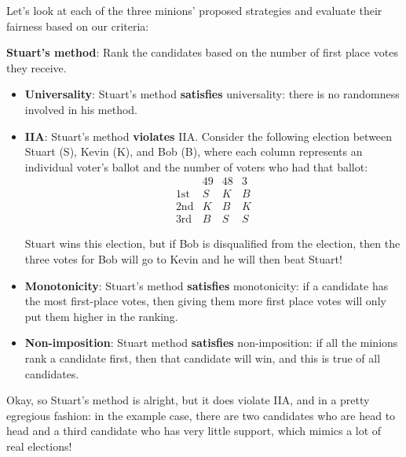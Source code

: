 \documentclass{article}
\begin{document}
Let’s look at each of the three minions’ proposed strategies and evaluate their fairness based on our criteria:

\textbf{Stuart’s method}: Rank the candidates based on the number of first place votes they receive.
\begin{itemize}
	\item \textbf{Universality}: Stuart’s method {\textbf{satisfies}} universality: there is no randomness involved in his method.
	\item \textbf{IIA}: Stuart’s method {\textbf{violates}} IIA. Consider the following election between Stuart (S), Kevin (K), and Bob (B), where each column represents an individual voter’s ballot and the number of voters who had that ballot:
	\[
		\begin{array}{c|ccc}
				& 49 & 48 & 3 \\
			\text{1st} & S & K & B \\
			\text{2nd} & K & B & K \\
			\text{3rd} & B & S & S
		\end{array}
	\]

	Stuart wins this election, but if Bob is disqualified from the election, then the three votes for Bob will go to Kevin and he will then beat Stuart! 
	\item \textbf{Monotonicity}: Stuart’s method {\textbf{satisfies}} monotonicity: if a candidate has the most first-place votes, then giving them more first place votes will only put them higher in the ranking. 
	\item \textbf{Non-imposition}: Stuart method {\textbf{satisfies}} non-imposition: if all the minions rank a candidate first, then that candidate will win, and this is true of all candidates. 
\end{itemize}
Okay, so Stuart’s method is alright, but it does violate IIA, and in a pretty egregious fashion: in the example case, there are two candidates who are head to head and a third candidate who has very little support, which mimics a lot of real elections! 
\end{document}
